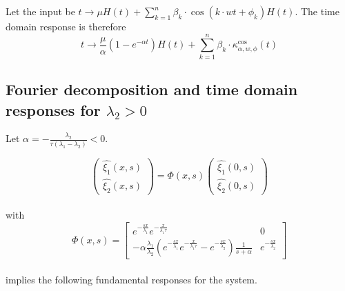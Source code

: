 \documentclass[preprint]{elsarticle}
\begin{document}
Let the input be $t\rightarrow\mu H\left(t\right)+\sum_{k=1}^{n}\beta_{k}\cdot \cos\left(k\cdot wt+\phi_{k}\right)H\left(t\right)$.
The time domain response is therefore 
\[
t\rightarrow\frac{\mu}{\alpha}\left(1-e^{-\alpha t}\right)H\left(t\right)+\sum_{k=1}^{n}\beta_{k}\cdot\kappa_{\alpha,w,\phi}^{\text{cos}}\left(t\right)
\]



\subsection{Fourier decomposition and time domain responses for $\lambda_{2}>0$}

Let $\alpha=-\frac{\lambda_{2}}{\tau\left(\lambda_{1}-\lambda_{2}\right)}<0$.

\[
\left(\begin{array}{c}
\widehat{\xi_{1}}\left(x,s\right)\\
\widehat{\xi_{2}}\left(x,s\right)
\end{array}\right)=\Phi\left(x,s\right)\left(\begin{array}{c}
\widehat{\xi_{1}}\left(0,s\right)\\
\widehat{\xi_{2}}\left(0,s\right)
\end{array}\right)
\]
\\
with 
\[
\Phi\left(x,s\right)=\left[\begin{array}{cc}
e^{-\frac{sx}{\lambda_{1}}}e^{-\frac{x}{\lambda_{1}\tau}} & 0\\
-\alpha\frac{\lambda_{1}}{\lambda_{2}}\left(e^{-\frac{sx}{\lambda_{1}}}e^{-\frac{x}{\lambda_{1}\tau}}-e^{-\frac{sx}{\lambda_{2}}}\right)\frac{1}{s+\alpha} & e^{-\frac{sx}{\lambda_{2}}}
\end{array}\right]
\]
\\
implies the following fundamental responses for the system.
\end{document}
